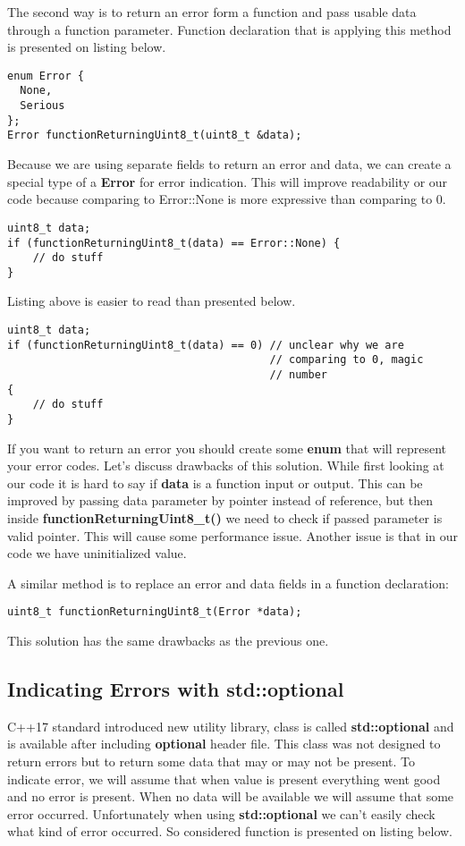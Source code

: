 \documentclass{article}
\let\Oldsubsection\subsection
\renewcommand{\subsection}{\FloatBarrier\Oldsubsection}
\begin{document}
The second way is to return an error form a function and pass usable data through a function parameter. Function declaration that is applying this method is presented on listing below.
\begin{lstlisting}
enum Error {
  None,
  Serious
};
Error functionReturningUint8_t(uint8_t &data);
\end{lstlisting}
Because we are using separate fields to return an error and data, we can create a special type of a \textbf{Error} for error indication. This will improve readability or our code because comparing to Error::None is more expressive than comparing to 0. 
\begin{lstlisting}
uint8_t data; 
if (functionReturningUint8_t(data) == Error::None) {
    // do stuff
}
\end{lstlisting}
Listing above is easier to read than presented below.
\begin{lstlisting}
uint8_t data;
if (functionReturningUint8_t(data) == 0) // unclear why we are 
                                         // comparing to 0, magic
                                         // number
{
    // do stuff
}
\end{lstlisting}

If you want to return an error you should create some \textbf{enum} that will represent your error codes.\newline
Let's discuss drawbacks of this solution. While first looking at our code it is hard to say if \textbf{data} is a function input or output. This can be improved by passing data parameter by pointer instead of reference, but then inside \textbf{functionReturningUint8\_t()} we need to check if passed parameter is valid pointer. This will cause some performance issue. Another issue is that in our code we have uninitialized value.

A similar method is to replace an error and data fields in a function declaration:
\begin{lstlisting}
uint8_t functionReturningUint8_t(Error *data);
\end{lstlisting}

This solution has the same drawbacks as the previous one.

\subsection{Indicating Errors with std::optional}
C++17 standard introduced new utility library, class is called \textbf{std::optional} and is available after including \textbf{optional} header file. This class was not designed to return errors but to return some data that may or may not be present. To indicate error, we will assume that when value is present everything went good and no error is present. When no data will be available we will assume that some error occurred. Unfortunately when using \textbf{std::optional} we can't easily check what kind of error occurred. So considered function is presented on listing below.
\end{document}
